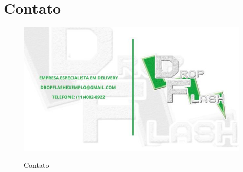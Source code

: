 \section{Contato}

\begin{figure} [!ht]
   { \centering
    \caption{Contato}
    \includegraphics[width=0.7\linewidth]{figuras/contato.png}
    \label{fig:enter-label}
    }
 \end{figure}   




